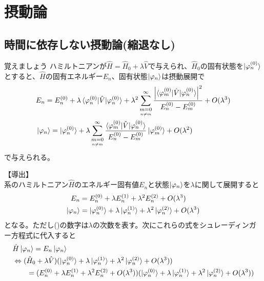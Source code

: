 \documentclass{jsarticle}  %
\numberwithin{equation}{section} %
\numberwithin{figure}{section}
\begin{document}
\section{摂動論}
\subsection{時間に依存しない摂動論(縮退なし)}
    \begin{itembox}[l]{\large{覚えましょう}}
        ハミルトニアンが$\hat{H} = \hat{H}_0 + \lambda \hat{V}$で与えられ、$\hat{H}_0$の固有状態を$\ket{\varphi_n^{(0)}}$とすると、$\hat{H}$の固有エネルギー$E_n$、固有状態$\ket{\varphi_n}$は摂動展開で
        \begin{align}
            &E_n = E_n^{(0)} + \lambda \braket{\varphi_n^{(0)}|\hat{V}|\varphi_n^{(0)}} + \lambda^2 \sum_{\underset{n\ne m}{m=0}}^\infty \frac{\left| \braket{\varphi_m^{(0)}|\hat{V}|\varphi_n^{(0)}} \right|^2}{E_n^{(0)} - E_m^{(0)}} +O(\lambda^3)\\
            &\ket{\varphi_n} = \ket{\varphi_n^{(0)}} + \lambda \sum_{\underset{n\ne m}{m=0}}^\infty \frac{ \braket{\varphi_m^{(0)}|\hat{V}|\varphi_n^{(0)}} }{E_n^{(0)} - E_m^{(0)}} \ket{\varphi_m^{(0)}} +O(\lambda^2)
        \end{align}
        で与えられる。
    \end{itembox}
    {\large{【導出】}}\\
    系のハミルトニアン$\hat{H}$のエネルギー固有値$E_n$と状態$\ket{\varphi_n}$を$\lambda$に関して展開すると
    \begin{align}
        E_n &= E_n^{(0)}+\lambda E_n^{(1)} + \lambda^2 E_n^{(2)} + O(\lambda^3)\\
        \ket{\varphi_n} &= \ket{\varphi_n^{(0)}} + \lambda \ket{\varphi_n^{(1)}} + \lambda^2 \ket{\varphi_n^{(2)}} + O(\lambda^3)
    \end{align}
    となる。ただし()の数字は$\lambda$の次数を表す。次にこれらの式をシュレーディンガー方程式に代入すると
    \begin{align}
        &\hat{H} \ket{\varphi_n} = E_n\ket{\varphi_n} \notag \\
        &\Leftrightarrow (\hat{H}_0 + \lambda\hat{V}) (\ket{\varphi_n^{(0)}} + \lambda \ket{\varphi_n^{(1)}} + \lambda^2 \ket{\varphi_n^{(2)}} + O(\lambda^3)) \\
        &\ \ \ \ \ \ = (E_n^{(0)}+\lambda E_n^{(1)} + \lambda^2 E_n^{(2)} + O(\lambda^3))(\ket{\varphi_n^{(0)}} + \lambda \ket{\varphi_n^{(1)}} + \lambda^2 \ket{\varphi_n^{(2)}} + O(\lambda^3))
    \end{align}
\end{document}
